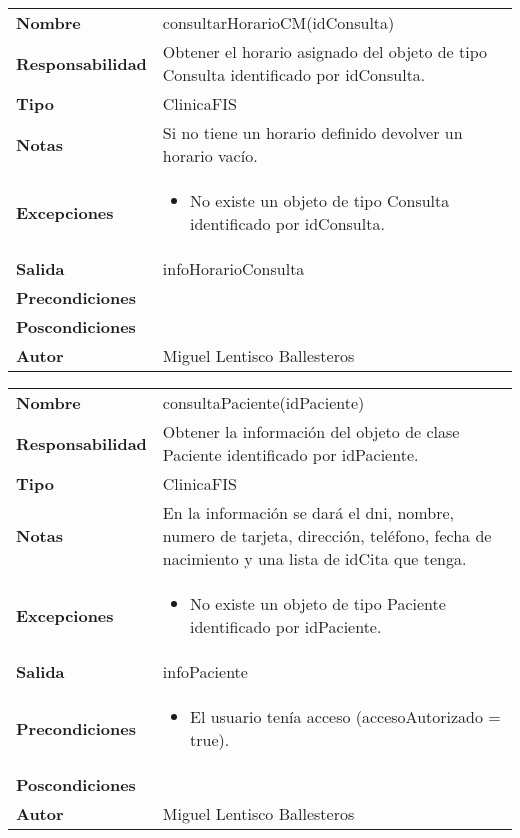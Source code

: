 \documentclass[11pt,a4paper]{article}
\newenvironment{itemizenomargins}
    {\begin{minipage}[t]{1\linewidth}\begin{itemize}}
    {\end{itemize}\end{minipage}}
\begin{document}
\begin{table}[H]
	\centering
	\label{my-label}
	\begin{tabularx}{\textwidth}{l|X}
		\textbf{Nombre}          & consultarHorarioCM(idConsulta)\\
		\textbf{Responsabilidad} & Obtener el horario asignado del objeto de tipo Consulta identificado por idConsulta. \\
		\textbf{Tipo}            & ClinicaFIS \\
		\textbf{Notas}           &  Si no tiene un horario definido devolver un horario vacío. \\
		\textbf{Excepciones}     &  
			\begin{itemizenomargins}
				\item No existe un objeto de tipo Consulta identificado por idConsulta.
			\end{itemizenomargins}		\\
		\textbf{Salida}          &  infoHorarioConsulta \\
		\textbf{Precondiciones}  &  \\
		\textbf{Poscondiciones}  &  \\
		\textbf{Autor}			 & Miguel Lentisco Ballesteros
	\end{tabularx}
\end{table}


\begin{table}[H]
	\centering
	\label{my-label}
	\begin{tabularx}{\textwidth}{l|X}
		\textbf{Nombre}          & consultaPaciente(idPaciente)\\
		\textbf{Responsabilidad} & Obtener la información del objeto de clase Paciente identificado por idPaciente. \\
		\textbf{Tipo}            & ClinicaFIS \\
		\textbf{Notas}           &  En la información se dará el dni, nombre, numero de tarjeta, dirección, teléfono, fecha de nacimiento y una lista de idCita que tenga. \\
		\textbf{Excepciones}     &  
			\begin{itemizenomargins}
				\item No existe un objeto de tipo Paciente identificado por idPaciente.
			\end{itemizenomargins}		\\
		\textbf{Salida}          &  infoPaciente \\
		\textbf{Precondiciones}  &  
			\begin{itemizenomargins}
				\item El usuario tenía acceso (accesoAutorizado = true).
			\end{itemizenomargins} \\
		\textbf{Poscondiciones}  &  \\
		\textbf{Autor}			 & Miguel Lentisco Ballesteros
	\end{tabularx}
\end{table}
\end{document}
